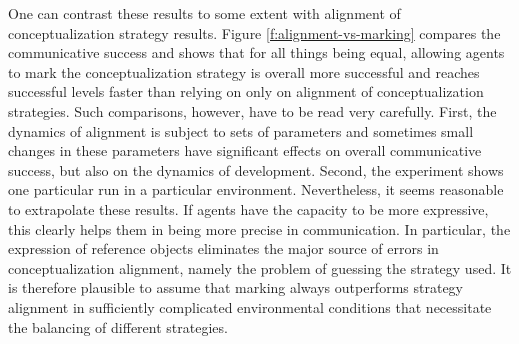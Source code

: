 One can contrast these results to some extent 
with alignment of conceptualization strategy results.
Figure \ref{f:alignment-vs-marking} compares the 
communicative success and shows that for all things
being equal, allowing agents to mark the 
conceptualization strategy is overall more successful
and reaches successful levels faster than relying on 
only on alignment of conceptualization strategies.
Such comparisons, however, have to be read very carefully. 
First, the dynamics of alignment is
subject to sets of parameters and sometimes small 
changes in these parameters have significant 
effects on overall communicative success, but also 
on the dynamics of development. Second,
the experiment shows one particular run in a particular environment. Nevertheless, it seems
reasonable to extrapolate these results. If agents have the capacity to be more expressive, this clearly helps them in being more precise in communication. 
In particular, the expression of reference objects eliminates the major 
source of errors in conceptualization alignment, 
namely the problem of guessing the strategy used. It is therefore plausible to assume that
marking always outperforms strategy alignment in sufficiently complicated environmental conditions
that necessitate the balancing of different strategies.


